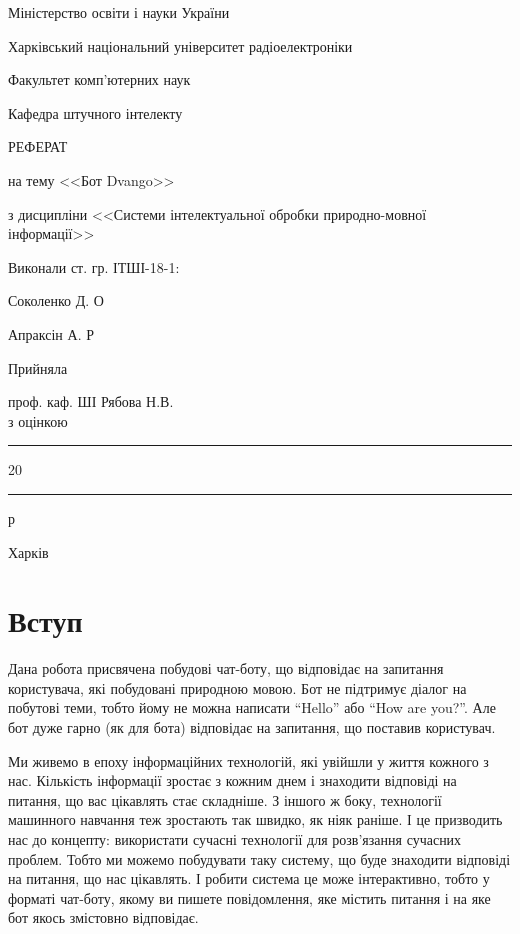 \documentclass[a4paper,14pt]{extreport}
\newcommand\chap[1]{%
  \chapter*{#1}%
  \addcontentsline{toc}{chapter}{\uppercase{#1}}}
\begin{document}
\begin{titlepage}
	\centering
    Міністерство освіти і науки України
    
    Харківський національний університет радіоелектроніки
    \vspace{1cm}

    Факультет комп'ютерних наук
    \vspace{1cm}

    Кафедра штучного інтелекту

    \vspace{2cm}
    \uppercase{Реферат}
    \vspace{1cm}

    на тему <<Бот Dvango>>
    \vspace{1cm}

    з дисципліни <<Системи інтелектуальної обробки природно-мовної інформації>>

    \begin{flushleft}
    \vspace{4cm}
    Виконали ст. гр. ІТШІ-18-1:
    \begin{minipage}[t]{10cm}
        Соколенко Д. О

        Апраксін А. Р
    \end{minipage}

    \vspace{1cm}

    Прийняла
    \begin{minipage}[t]{10cm}
        проф. каф. ШІ Рябова Н.В.\\
        з оцінкою \say{\rule{2cm}{0.15mm}}\\
        \say{\rule{0.7cm}{0.15mm}}\rule{2cm}{0.15mm}20\rule{0.7cm}{0.15mm}р
    \end{minipage}
    \end{flushleft}
	\vfill

	{Харків \the\year{}}
\end{titlepage}
\restoregeometry

\tableofcontents
\newpage

\setcounter{page}{3}
\chap{Вступ}
    Дана робота присвячена побудові чат-боту, що відповідає на запитання користувача, які побудовані природною мовою. Бот не підтримує діалог на побутові теми, тобто йому не можна написати ``Hello'' або ``How are you?''. Але бот дуже гарно (як для бота) відповідає на запитання, що поставив користувач.

    Ми живемо в епоху інформаційних технологій, які увійшли у життя кожного з нас. Кількість інформації зростає з кожним днем і знаходити відповіді на питання, що вас цікавлять стає складніше. З іншого ж боку, технології машинного навчання теж зростають так швидко, як ніяк раніше. І це призводить нас до концепту: використати сучасні технології для розв'язання сучасних проблем. Тобто ми можемо побудувати таку систему, що буде знаходити відповіді на питання, що нас цікавлять. І робити система це може інтерактивно, тобто у форматі чат-боту, якому ви пишете повідомлення, яке містить питання і на яке бот якось змістовно відповідає.
\end{document}
